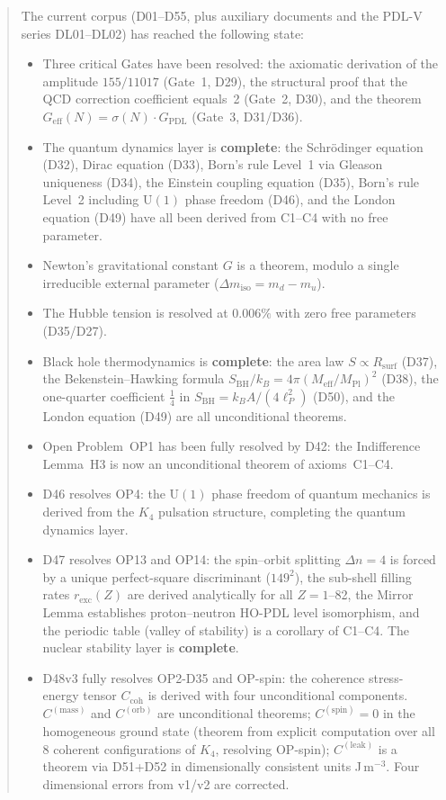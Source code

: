 \documentclass[11pt,a4paper]{article}
\theoremstyle{plain}
\theoremstyle{definition}
\theoremstyle{remark}
\newcommand{\Kfour}{K_4}
\newcommand{\Geff}{G_{\mathrm{eff}}}
\newcommand{\GPDL}{G_{\mathrm{PDL}}}
\newcommand{\Rsurf}{R_{\mathrm{surf}}}
\newcommand{\sigmaN}{\sigma(N)}
\newcommand{\SBH}{S_{\mathrm{BH}}}
\newcommand{\Meff}{M_{\mathrm{eff}}}
\newcommand{\MPl}{M_{\mathrm{Pl}}}
\newcommand{\Ccoh}{C_{\mathrm{coh}}}
\begin{document}
\begin{abstract}
The current corpus (D01--D55, plus auxiliary documents and the PDL-V series DL01--DL02) has reached the following state:
\begin{itemize}
\item Three critical Gates have been resolved: the axiomatic derivation of the amplitude $155/11017$ (Gate~1, D29), the structural proof that the QCD correction coefficient equals~2 (Gate~2, D30), and the theorem $\Geff(N)=\sigmaN\cdot\GPDL$ (Gate~3, D31/D36).
\item The quantum dynamics layer is \textbf{complete}: the Schr\"odinger equation (D32), Dirac equation (D33), Born's rule Level~1 via Gleason uniqueness (D34), the Einstein coupling equation (D35), Born's rule Level~2 including $\mathrm{U}(1)$ phase freedom (D46), and the London equation (D49) have all been derived from C1--C4 with no free parameter.
\item Newton's gravitational constant $G$ is a theorem, modulo a single irreducible external parameter ($\Delta m_{\mathrm{iso}} = m_d - m_u$).
\item The Hubble tension is resolved at $0.006\%$ with zero free parameters (D35/D27).
\item Black hole thermodynamics is \textbf{complete}: the area law $S \propto \Rsurf$ (D37), the Bekenstein--Hawking formula $\SBH/k_B = 4\pi(\Meff/\MPl)^2$ (D38), the one-quarter coefficient $\tfrac{1}{4}$ in $\SBH = k_B A/(4\ell_P^2)$ (D50), and the London equation (D49) are all unconditional theorems.
\item Open Problem~OP1 has been fully resolved by D42: the Indifference Lemma~H3 is now an unconditional theorem of axioms~C1--C4.
\item D46 resolves OP4: the $\mathrm{U}(1)$ phase freedom of quantum mechanics is derived from the $\Kfour$ pulsation structure, completing the quantum dynamics layer.
\item D47 resolves OP13 and OP14: the spin--orbit splitting $\Delta n = 4$ is forced by a unique perfect-square discriminant ($149^2$), the sub-shell filling rates $r_{\mathrm{exc}}(Z)$ are derived analytically for all $Z = 1$--82, the Mirror Lemma establishes proton--neutron HO-PDL level isomorphism, and the periodic table (valley of stability) is a corollary of C1--C4. The nuclear stability layer is \textbf{complete}.
\item D48v3 fully resolves OP2-D35 and OP-spin: the coherence stress-energy tensor $\Ccoh$ is derived with four unconditional components. $C^{(\mathrm{mass})}$ and $C^{(\mathrm{orb})}$ are unconditional theorems; $C^{(\mathrm{spin})}=0$ in the homogeneous ground state (theorem from explicit computation over all 8 coherent configurations of $K_4$, resolving OP-spin); $C^{(\mathrm{leak})}$ is a theorem via D51+D52 in dimensionally consistent units J\,m$^{-3}$. Four dimensional errors from v1/v2 are corrected.

\end{itemize}
\end{abstract}
\end{document}
